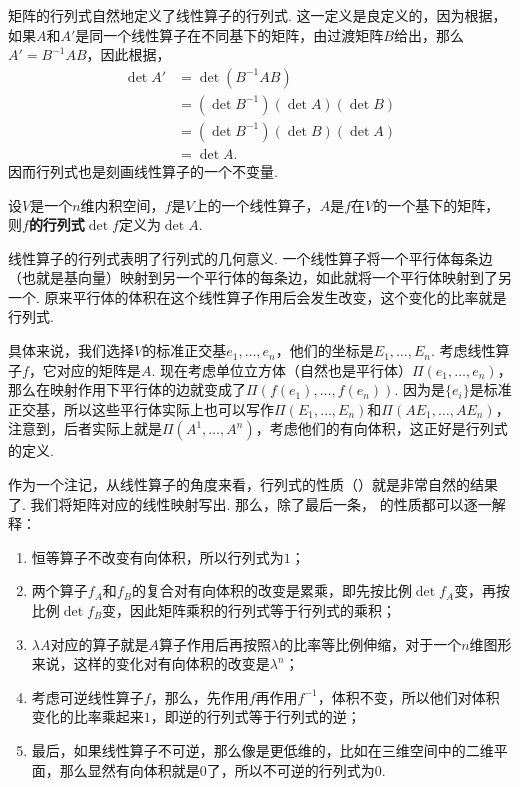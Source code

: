 矩阵的行列式自然地定义了线性算子的行列式. 这一定义是良定义的，因为根据，如果$A$和$A'$是同一个线性算子在不同基下的矩阵，由过渡矩阵$B$给出，那么$A'=B^{-1}AB$，因此根据，
\begin{align*}
    \det A'&=\det(B^{-1}AB)\\
    &=(\det B^{-1})(\det A)(\det B)\\
    &=(\det B^{-1})(\det B)(\det A)\\
    &=\det A.
\end{align*}
因而行列式也是刻画线性算子的一个不变量. 

\begin{definition}[线性算子的行列式]
设$V$是一个$n$维内积空间，$f$是$V$上的一个线性算子，$A$是$f$在$V$的一个基下的矩阵，则$f$\textbf{的行列式}$\det f$定义为$\det A$.
\end{definition}

线性算子的行列式表明了行列式的几何意义. 一个线性算子将一个平行体每条边（也就是基向量）映射到另一个平行体的每条边，如此就将一个平行体映射到了另一个. 原来平行体的体积在这个线性算子作用后会发生改变，这个变化的比率就是行列式. 

具体来说，我们选择$V$的标准正交基$e_1,\dots,e_n$，他们的坐标是$E_1,\dots,E_n$. 考虑线性算子$f$，它对应的矩阵是$A$. 现在考虑单位立方体（自然也是平行体）$\Pi(e_1,\dots,e_n)$，那么在映射作用下平行体的边就变成了$\Pi(f(e_1),\dots,f(e_n))$. 因为是$\{e_i\}$是标准正交基，所以这些平行体实际上也可以写作$\Pi(E_1,\dots,E_n)$和$\Pi(AE_1,\dots,AE_n)$，注意到，后者实际上就是$\Pi(A^1,\dots, A^n)$，考虑他们的有向体积，这正好是行列式的定义. 

作为一个注记，从线性算子的角度来看，行列式的性质（）就是非常自然的结果了. 我们将矩阵对应的线性映射写出. 那么，除了最后一条， 的性质都可以逐一解释：
\begin{enumerate}
    \item 恒等算子不改变有向体积，所以行列式为$1$；
    \item 两个算子$f_A$和$f_B$的复合对有向体积的改变是累乘，即先按比例$\det f_A$变，再按比例$\det f_B$变，因此矩阵乘积的行列式等于行列式的乘积；
    \item $\lambda A$对应的算子就是$A$算子作用后再按照$\lambda$的比率等比例伸缩，对于一个$n$维图形来说，这样的变化对有向体积的改变是$\lambda^n$；
    \item 考虑可逆线性算子$f$，那么，先作用$f$再作用$f^{-1}$，体积不变，所以他们对体积变化的比率乘起来$1$，即逆的行列式等于行列式的逆；
    \item 最后，如果线性算子不可逆，那么像是更低维的，比如在三维空间中的二维平面，那么显然有向体积就是$0$了，所以不可逆的行列式为$0$.
\end{enumerate}

